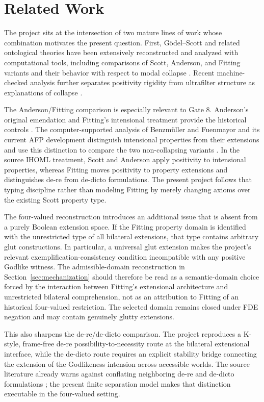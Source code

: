 \section{Related Work}
\label{sec:related}

The project sits at the intersection of two mature lines of work whose combination motivates the present question. First, G\"odel--Scott and related ontological theories have been extensively reconstructed and analyzed with computational tools, including comparisons of Scott, Anderson, and Fitting variants and their behavior with respect to modal collapse \cite{BenzmuellerScott2025,BenzmuellerFuenmayor2019}. Recent machine-checked analysis further separates positivity rigidity from ultrafilter structure as explanations of collapse \cite{Benzmueller2026Collapse}.

The Anderson/Fitting comparison is especially relevant to Gate 8. Anderson's original emendation and Fitting's intensional treatment provide the historical controls \cite{Anderson1990,Fitting2002}. The computer-supported analysis of Benzm\"uller and Fuenmayor and its current AFP development distinguish intensional properties from their extensions and use this distinction to compare the two non-collapsing variants \cite{BenzmuellerFuenmayor2019,FuenmayorBenzmuellerAFP}. In the source IHOML treatment, Scott and Anderson apply positivity to intensional properties, whereas Fitting moves positivity to property extensions and distinguishes de-re from de-dicto formulations. The present project follows that typing discipline rather than modeling Fitting by merely changing axioms over the existing Scott property type.

The four-valued reconstruction introduces an additional issue that is absent from a purely Boolean extension space. If the Fitting property domain is identified with the unrestricted type of all bilateral extensions, that type contains arbitrary glut constructions. In particular, a universal glut extension makes the project's relevant exemplification-consistency condition incompatible with any positive Godlike witness. The admissible-domain reconstruction in Section~\ref{sec:mechanization} should therefore be read as a semantic-domain choice forced by the interaction between Fitting's extensional architecture and unrestricted bilateral comprehension, not as an attribution to Fitting of an historical four-valued restriction. The selected domain remains closed under FDE negation and may contain genuinely glutty extensions.

This also sharpens the de-re/de-dicto comparison. The project reproduces a K-style, frame-free de-re possibility-to-necessity route at the bilateral extensional interface, while the de-dicto route requires an explicit stability bridge connecting the extension of the Godlikeness intension across accessible worlds. The source literature already warns against conflating neighboring de-re and de-dicto formulations \cite{BenzmuellerFuenmayor2019}; the present finite separation model makes that distinction executable in the four-valued setting.

